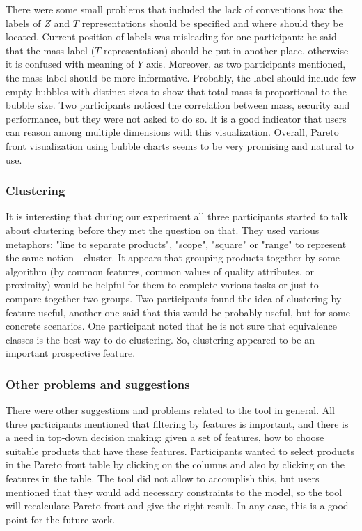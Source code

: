 \documentclass{acm_proc_article-sp}
\begin{document}
There were some small problems that included the lack of conventions how the labels of $Z$ and $T$ representations should be specified and where should they be located. Current position of labels was misleading for one participant: he said that the mass label ($T$ representation) should be put in another place, otherwise it is confused with meaning of $Y$ axis. Moreover, as two participants mentioned, the mass label should be more informative. Probably, the label should include few empty bubbles with distinct sizes to show that total mass is proportional to the bubble size.
Two participants noticed the correlation between mass, security and performance, but they were not asked to do so. It is a good indicator that users can reason among multiple dimensions with this visualization.
Overall, Pareto front visualization using bubble charts seems to be very promising and natural to use.

\subsubsection{Clustering}

It is interesting that during our experiment all three participants started to talk about clustering before they met the question on that. They used various metaphors: "line to separate products", "scope", "square" or "range" to represent the same notion - cluster. It appears that grouping products together by some algorithm (by common features, common values of quality attributes, or proximity) would be helpful for them to complete various tasks or just to compare together two groups. Two participants found the idea of clustering by feature useful, another one said that this would be probably useful, but for some concrete scenarios. One participant noted that he is not sure that equivalence classes is the best way to do clustering. So, clustering appeared to be an important prospective feature.

\subsubsection{Other problems and suggestions}

There were other suggestions and problems related to the tool in general. All three participants mentioned that filtering by features is important, and there is a need in top-down decision making: given a set of features, how to choose suitable products that have these features. Participants wanted to select products in the Pareto front table by clicking on the columns and also by clicking on the features in the table. The tool did not allow to accomplish this, but users mentioned that they would add necessary constraints to the model, so the tool will recalculate Pareto front and give the right result. In any case, this is a good point for the future work. 
\end{document}
